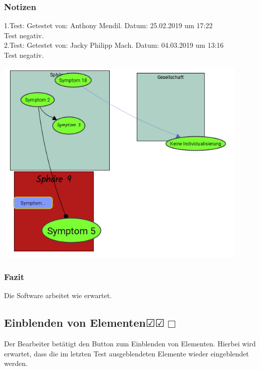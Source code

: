 \documentclass[enabledeprecatedfontcommands]{scrartcl}
\newcommand{\subsectiont}[2]{\subsection[#1]{#1{\normalsize\normalfont #2}}}
\newcommand{\leer}{$\Box$}
\newcommand{\ok}{$\CheckedBox$}
\begin{document}
\subsubsection{Notizen}
1.Test: Getestet von: Anthony Mendil. Datum: 25.02.2019 um 17:22 \\
Test negativ. \\
2.Test: Getestet von: Jacky Philipp Mach. Datum: 04.03.2019 um 13:16 \\
Test negativ.
\begin{center}
\includegraphics[height=10cm]{3_53ausgeblendet.PNG}
\end{center}
\subsubsection{Fazit}
Die Software arbeitet wie erwartet.

\subsectiont{Einblenden von Elementen}{\dotfill\ok\ok\leer}
Der Bearbeiter betätigt den Button zum Einblenden von Elementen. Hierbei wird erwartet, dass die im letzten Test ausgeblendeten Elemente wieder eingeblendet werden. 
\end{document}

